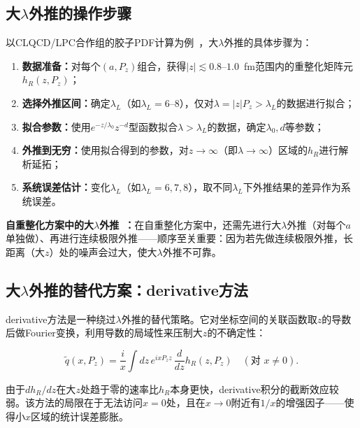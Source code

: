 \documentclass[12pt,a4paper]{ctexart}
\theoremstyle{definition}
\begin{document}
\subsection{大$\lambda$外推的操作步骤}

以CLQCD/LPC合作组的胶子PDF计算为例~\cite{Chen2025gluon}，大$\lambda$外推的具体步骤为：

\begin{enumerate}[leftmargin=*]
    \item \textbf{数据准备：}对每个$(a, P_z)$组合，获得$|z| \lesssim 0.8\text{--}1.0$~fm范围内的重整化矩阵元$h_R(z, P_z)$；
    \item \textbf{选择外推区间：}确定$\lambda_L$（如$\lambda_L = 6\text{--}8$），仅对$\lambda = |z|P_z > \lambda_L$的数据进行拟合；
    \item \textbf{拟合参数：}使用$e^{-z/\lambda_0} z^{-d}$型函数拟合$\lambda > \lambda_L$的数据，确定$\lambda_0, d$等参数；
    \item \textbf{外推到无穷：}使用拟合得到的参数，对$z \to \infty$（即$\lambda \to \infty$）区域的$h_R$进行解析延拓；
    \item \textbf{系统误差估计：}变化$\lambda_L$（如$\lambda_L = 6, 7, 8$），取不同$\lambda_L$下外推结果的差异作为系统误差。
\end{enumerate}

\textbf{自重整化方案中的大$\lambda$外推~\cite{FirstSelfRenormGluon2024}：}在自重整化方案中，还需先进行大$\lambda$外推（对每个$a$单独做）、再进行连续极限外推——顺序至关重要：因为若先做连续极限外推，长距离（大$z$）处的噪声会过大，使大$\lambda$外推不可靠。

\subsection{大$\lambda$外推的替代方案：derivative方法}

derivative方法是一种绕过$\lambda$外推的替代策略。它对坐标空间的关联函数取$z$的导数后做Fourier变换，利用导数的局域性来压制大$z$的不确定性：

\begin{equation}
\tilde{q}(x, P_z) = \frac{i}{x} \int dz\, e^{i x P_z z}\, \frac{d}{dz} h_R(z, P_z) \quad (\text{对 } x \neq 0).
\label{eq:derivative_method}
\end{equation}

由于$dh_R/dz$在大$z$处趋于零的速率比$h_R$本身更快，derivative积分的截断效应较弱。该方法的局限在于无法访问$x=0$处，且在$x \to 0$附近有$1/x$的增强因子——使得小$x$区域的统计误差膨胀。
\end{document}
